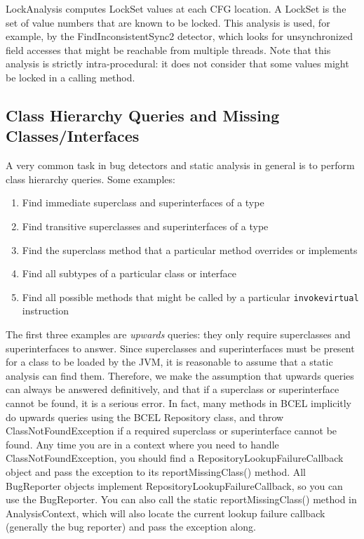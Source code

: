 \documentclass[11pt]{article}
\begin{document}
LockAnalysis computes LockSet values at each CFG location.  A LockSet is
the set of value numbers that are known to be locked.  This analysis
is used, for example, by the FindInconsistentSync2 detector, which looks for
unsynchronized field accesses that might be reachable from multiple threads.
Note that this analysis is strictly intra-procedural: it does not consider
that some values might be locked in a calling method.

\subsection{Class Hierarchy Queries and Missing Classes/Interfaces}

A very common task in bug detectors and static analysis in general
is to perform class hierarchy queries.  Some examples:
\begin{enumerate}
\item Find immediate superclass and superinterfaces of a type
\item Find transitive superclasses and superinterfaces of a type
\item Find the superclass method that a particular method overrides or implements
\item Find all subtypes of a particular class or interface
\item Find all possible methods that might be called by a particular
      {\tt invokevirtual} instruction
\end{enumerate}

The first three examples are {\em upwards} queries: they only require
superclasses and superinterfaces to answer.  Since superclasses and superinterfaces
must be present for a class to be loaded by the JVM, it is reasonable
to assume that a static analysis can find them.  Therefore, we
make the assumption that upwards queries can always be answered definitively,
and that if a superclass or superinterface cannot be found, it is
a serious error.  In fact, many methods in BCEL implicitly do
upwards queries using the BCEL Repository class, and throw
ClassNotFoundException if a required superclass or superinterface
cannot be found.  Any time you are in a context where you need to
handle ClassNotFoundException, you should find a RepositoryLookupFailureCallback
object and pass the exception to its reportMissingClass() method.
All BugReporter objects implement RepositoryLookupFailureCallback,
so you can use the BugReporter.  You can also call the static
reportMissingClass() method in AnalysisContext, which will also locate
the current lookup failure callback (generally the bug reporter)
and pass the exception along.
\end{document}
